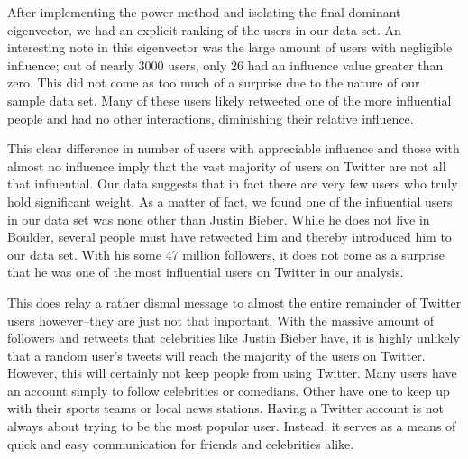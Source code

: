 After implementing the power method and isolating the final dominant eigenvector, we had an explicit ranking of the users in our data set. An interesting note in this eigenvector was the large amount of users with negligible influence; out of nearly 3000 users, only 26 had an influence value greater than zero. This did not come as too much of a surprise due to the nature of our sample data set. Many of these users likely retweeted one of the more influential people and had no other interactions, diminishing their relative influence.

This clear difference in number of users with appreciable influence and those with almost no influence imply that the vast majority of users on Twitter are not all that influential. Our data suggests that in fact there are very few users who truly hold significant weight. As a matter of fact, we found one of the influential users in our data set was none other than Justin Bieber. While he does not live in Boulder, several people must have retweeted him and thereby introduced him to our data set. With his some 47 million followers, it does not come as a surprise that he was one of the most influential users on Twitter in our analysis.

This does relay a rather dismal message to almost the entire remainder of Twitter users however--they are just not that important. With the massive amount of followers and retweets that celebrities like Justin Bieber have, it is highly unlikely that a random user's tweets will reach the majority of the users on Twitter. However, this will certainly not keep people from using Twitter. Many users have an account simply to follow celebrities or comedians. Other have one to keep up with their sports teams or local news stations. Having a Twitter account is not always about trying to be the most popular user. Instead, it serves as a means of quick and easy communication for friends and celebrities alike.
